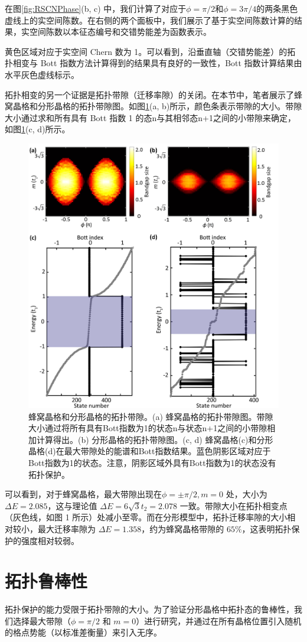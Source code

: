 在图\ref{fig:RSCNPhase}(b, c) 中，我们计算了对应于$\phi=\pi/2$和$\phi=3\pi/4$的两条黑色虚线上的实空间陈数。在右侧的两个面板中，我们展示了基于实空间陈数计算的结果，实空间陈数以本征态编号和交错势能差为函数表示。

黄色区域对应于实空间 Chern 数为 1。可以看到，沿垂直轴（交错势能差）的拓扑相变与 Bott 指数方法计算得到的结果具有良好的一致性，Bott 指数计算结果由水平灰色虚线标示。

拓扑相变的另一个证据是拓扑带隙（迁移率隙）的关闭。在本节中，笔者展示了蜂窝晶格和分形晶格的拓扑带隙图。如图\ref{fig:HaldBandGap}(a, b)所示，颜色条表示带隙的大小。带隙大小通过求和所有具有 Bott 指数 1 的态n与其相邻态n+1之间的小带隙来确定，如图\ref{fig:HaldBandGap}(c, d)所示。

\begin{figure}[htbp]
    \centering
    \includegraphics[width=0.65\linewidth]{figure/FracHaldTheo/BandGap.png}
    \caption{蜂窝晶格和分形晶格的拓扑带隙。(a) 蜂窝晶格的拓扑带隙图。带隙大小通过将所有具有Bott指数为1的状态n与状态n+1之间的小带隙相加计算得出。(b) 分形晶格的拓扑带隙图。(c, d) 蜂窝晶格(c)和分形晶格(d)在最大带隙处的能谱和Bott指数结果。蓝色阴影区域对应于Bott指数为1的状态。注意，阴影区域外具有Bott指数为1的状态没有拓扑保护。}
    \label{fig:HaldBandGap}
\end{figure}

可以看到，对于蜂窝晶格，最大带隙出现在$\phi=±π/2, m=0$ 处，大小为 $\Delta E=2.085$，这与理论值 $\Delta E=6\sqrt{3}t_2=2.078$ 一致。带隙大小在拓扑相变点（灰色线，如图 1 所示）处减小至零。而在分形模型中，拓扑迁移率隙的大小相对较小，最大迁移率隙为 $\Delta E=1.358$，约为蜂窝晶格带隙的 $65\%$，这表明拓扑保护的强度相对较弱。

\section{拓扑鲁棒性}
\label{sec:HaldRobust}
拓扑保护的能力受限于拓扑带隙的大小。为了验证分形晶格中拓扑态的鲁棒性，我们选择最大带隙（$\phi = \pi/2$ 和 $m = 0$）进行研究，并通过在所有晶格位置引入随机的格点势能（以标准差衡量）来引入无序。

